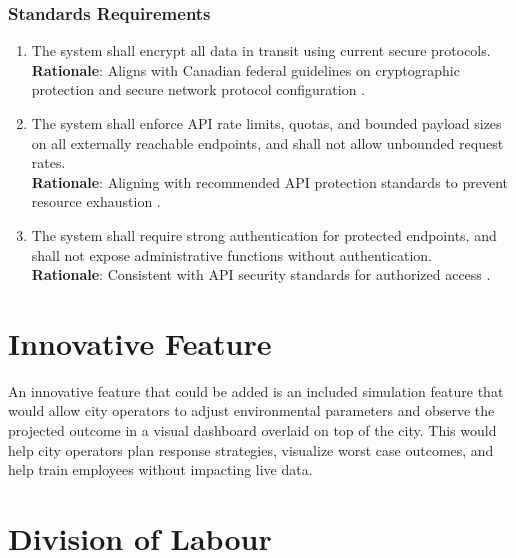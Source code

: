 \documentclass[]{article}
\begin{document}
\subsubsection{Standards Requirements}
\label{ssub:standards_requirements}
\begin{enumerate}[{LR-STD}1. ]
    \item The system shall encrypt all data in transit using current secure protocols. \\
    \textbf{Rationale}: Aligns with Canadian federal guidelines on cryptographic protection and secure network protocol configuration \cite{canEncrypt,secureProtocols}.

    \item The system shall enforce API rate limits, quotas, and bounded payload sizes on all externally reachable endpoints, and shall not allow unbounded request rates. \\
    \textbf{Rationale}: Aligning with recommended API protection standards to prevent resource exhaustion \cite{nistAPI}.

    \item The system shall require strong authentication for protected endpoints, and shall not expose administrative functions without authentication. \\
    \textbf{Rationale}: Consistent with API security standards for authorized access \cite{nistAPI}.
\end{enumerate}


\section{Innovative Feature}
\label{sec:innovative_feature}
An innovative feature that could be added is an included simulation feature that would allow city operators to adjust environmental parameters and observe the projected outcome in a visual dashboard overlaid on top of the city. This would help city operators plan response strategies, visualize worst case outcomes, and help train employees without impacting live data.

\appendix
\section{Division of Labour}
\label{sec:division_of_labour}
\end{document}
